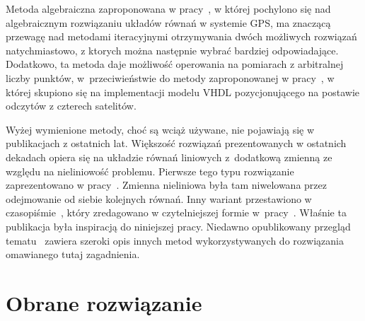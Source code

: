 Metoda algebraiczna zaproponowana w pracy~\cite{4104017}, w której pochylono się nad algebraicznym rozwiązaniu układów równań w systemie GPS, ma znaczącą przewagę nad metodami iteracyjnymi otrzymywania dwóch możliwych rozwiązań natychmiastowo, z ktorych można następnie wybrać bardziej odpowiadające. Dodatkowo, ta metoda daje możliwość operowania na pomiarach z arbitralnej liczby punktów, w~przeciwieństwie do metody zaproponowanej w pracy~\cite{article}, w której skupiono się na implementacji modelu VHDL pozycjonującego na postawie odczytów z czterech satelitów.

Wyżej wymienione metody, choć są wciąż używane, nie pojawiają się w publikacjach z ostatnich lat. Większość rozwiązań prezentowanych w ostatnich dekadach opiera się na układzie równań liniowych z~dodatkową zmienną ze względu na nieliniowość problemu. Pierwsze tego typu rozwiązanie zaprezentowano w pracy~\cite{301830}. Zmienna nieliniowa była tam niwelowana przez odejmowanie od siebie kolejnych równań. Inny wariant przestawiono w czasopiśmie~\cite{1018778}, który zredagowano w czytelniejszej formie w~pracy~\cite{norrdine2012algebraic}. Właśnie ta publikacja była inspiracją do niniejszej pracy. Niedawno opublikowany przegląd tematu~\cite{10419087} zawiera szeroki opis innych metod wykorzystywanych do rozwiązania omawianego tutaj zagadnienia.

\section{Obrane rozwiązanie}

